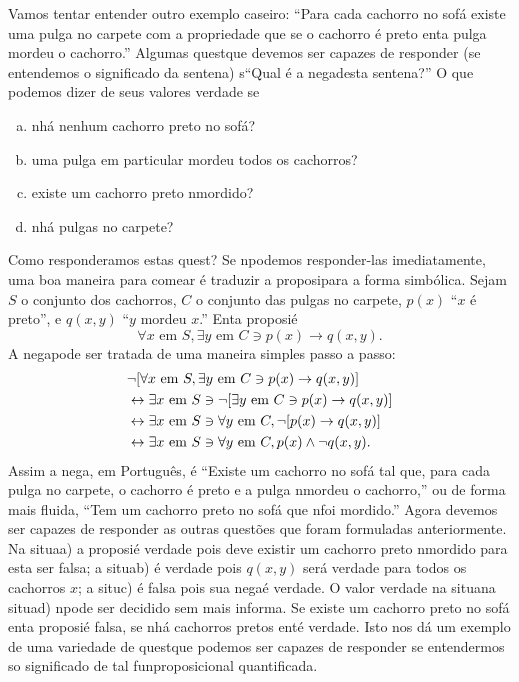 Vamos tentar entender outro exemplo caseiro: ``Para cada cachorro no sof\'a existe uma pulga no carpete com a propriedade que se o cachorro \'e preto ent\ao a pulga mordeu o cachorro.'' Algumas quest\oes que devemos ser capazes de responder (se entendemos o significado da senten\cc a) s\ao ``Qual \'e a nega\cao desta senten\cc a?'' O que podemos dizer de seus valores verdade se
\begin{enumerate}[a)]
\item n\ao h\'a nenhum cachorro preto no sof\'a? 
\item uma pulga em particular mordeu todos os cachorros?
\item existe um cachorro preto n\ao mordido?
\item n\ao h\'a pulgas no carpete?
\end{enumerate}
Como responder\ih amos estas quest\ois? Se n\ao podemos responder-las imediatamente, uma boa maneira para come\cc ar \'e traduzir a proposi\cao para a forma simb\'olica. Sejam $S$ o conjunto dos cachorros, $C$ o conjunto das pulgas no carpete, $p(x)$ ``$x$ \'e preto'', e $q(x,y)$  ``$y$ mordeu $x$.'' Ent\ao a proposi\cao \'e
\[
\forall x \textrm{ em } S, \exists y \textrm{ em } C \ni  p(x)\to q(x,y).
\]
A nega\cao pode ser tratada de uma maneira simples passo a passo:
\begin{equation*}
 \begin{aligned}
&\lnot[\forall x \textrm{ em } S, \exists y \textrm{ em } C \ni  p(x)\to q(x,y)]\\
&\leftrightarrow \exists x \textrm{ em } S \ni \lnot[\exists y \textrm{ em } C \ni  p(x)\to q(x,y)]\\
&\leftrightarrow \exists x \textrm{ em } S \ni \forall y \textrm{ em } C,  \lnot[p(x)\to q(x,y)]\\
&\leftrightarrow \exists x \textrm{ em } S \ni \forall y \textrm{ em } C,  p(x)\wedge\lnot q(x,y).
 \end{aligned}
\end{equation*}
Assim a nega\caoi, em Portugu\^es, \'e ``Existe um cachorro no sof\'a tal que, para cada pulga no carpete, o cachorro \'e preto e a pulga n\ao mordeu o cachorro,'' ou de forma mais fluida, ``Tem um cachorro preto no sof\'a que n\ao foi mordido.'' Agora devemos ser capazes de responder as outras quest\~oes que foram formuladas anteriormente. Na situa\cao a) a proposi\cao \'e verdade pois deve existir um cachorro preto n\ao mordido para esta ser falsa; a situa\cao b) \'e verdade pois $q(x,y)$ ser\'a verdade para todos os cachorros $x$; a situ\cao c) \'e falsa pois sua nega\cao \'e verdade. O valor verdade na situa\cao na situa\cao d) n\ao pode ser decidido sem mais informa\cois. Se existe um cachorro preto no sof\'a ent\ao a proposi\cao \'e falsa, se n\ao h\'a cachorros pretos ent\ao \'e verdade. Isto nos d\'a um exemplo de uma variedade de quest\oes que podemos ser capazes de responder se entendermos so significado de tal fun\cao proposicional quantificada.

